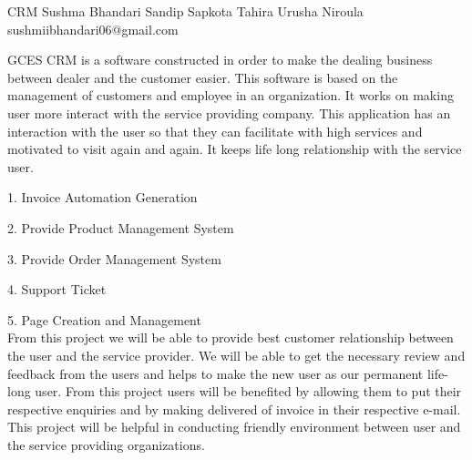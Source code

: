  \begin{conf-abstract}[]
 {CRM}
 {Sushma Bhandari
 	 Sandip Sapkota
 	  Tahira Urusha Niroula
 }
{sushmiibhandari06@gmail.com}

GCES CRM is a software constructed in order to make the dealing business between dealer and the customer easier. This software is based on the management of customers and employee in an organization. It works on making user more interact with the service providing company. This application has an interaction with the user so that they can facilitate with high services and motivated to visit again and again. It keeps life long relationship with the service user.

1. Invoice Automation Generation

2. Provide Product Management System

3. Provide Order Management System

4. Support Ticket

5. Page Creation and Management
\\
From this project we will be able to provide best customer relationship
between the user and the service provider. We will be able to get the
necessary review and feedback from the users and helps to make the
new user as our permanent life-long user. From this project users will
be benefited by allowing them to put their respective enquiries and by
making delivered of invoice in their respective e-mail. This project will
be helpful in conducting friendly environment between user and the
service providing organizations.

 \end{conf-abstract}